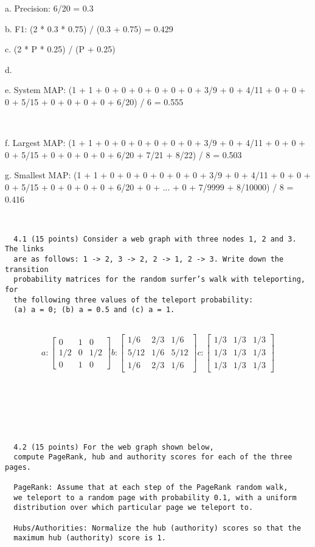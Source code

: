 \documentclass[12pt]{article}
\begin{document}
a. Precision: 6/20 = 0.3

b. F1: (2 * 0.3 * 0.75) / (0.3 + 0.75) = 0.429

c. (2 * P * 0.25) / (P + 0.25)

d.

e. System MAP: (1 + 1 + 0 + 0 + 0 + 0 + 0 + 0 + 3/9 + 0 + 4/11 + 0 + 0 + 0 + 5/15 + 0 + 0 + 0 + 0 + 6/20) / 6 = 0.555

\

f. Largest MAP: (1 + 1 + 0 + 0 + 0 + 0 + 0 + 0 + 3/9 + 0 + 4/11 + 0 + 0 + 0 + 5/15 + 0 + 0 + 0 + 0 + 6/20 + 7/21 + 8/22) / 8 = 0.503

g. Smallest MAP: (1 + 1 + 0 + 0 + 0 + 0 + 0 + 0 + 3/9 + 0 + 4/11 + 0 + 0 + 0 + 5/15 + 0 + 0 + 0 + 0 + 6/20 + 0 + ... + 0 + 7/9999 + 8/10000) / 8 = 0.416

\

\begin{verbatim}
  4.1 (15 points) Consider a web graph with three nodes 1, 2 and 3. The links
  are as follows: 1 -> 2, 3 -> 2, 2 -> 1, 2 -> 3. Write down the transition
  probability matrices for the random surfer’s walk with teleporting, for
  the following three values of the teleport probability:
  (a) a = 0; (b) a = 0.5 and (c) a = 1.
  
\end{verbatim}

\begin{displaymath} a:
  \begin{bmatrix}
     0 & 1 & 0\\
     1/2 & 0 & 1/2 \\
     0 & 1 & 0  
  \end{bmatrix} b:
  \begin{bmatrix}
     1/6 & 2/3 & 1/6 \\
     5/12 & 1/6 & 5/12 \\
     1/6 & 2/3 & 1/6 
  \end{bmatrix} c:
  \begin{bmatrix}
     1/3 & 1/3 & 1/3 \\
     1/3 & 1/3 & 1/3 \\
     1/3 & 1/3 & 1/3  
  \end{bmatrix}
\end{displaymath}

\

\

\

\begin{verbatim}
  4.2 (15 points) For the web graph shown below,
  compute PageRank, hub and authority scores for each of the three pages.
  
  PageRank: Assume that at each step of the PageRank random walk, 
  we teleport to a random page with probability 0.1, with a uniform 
  distribution over which particular page we teleport to.

  Hubs/Authorities: Normalize the hub (authority) scores so that the
  maximum hub (authority) score is 1.
\end{verbatim}
\end{document}
